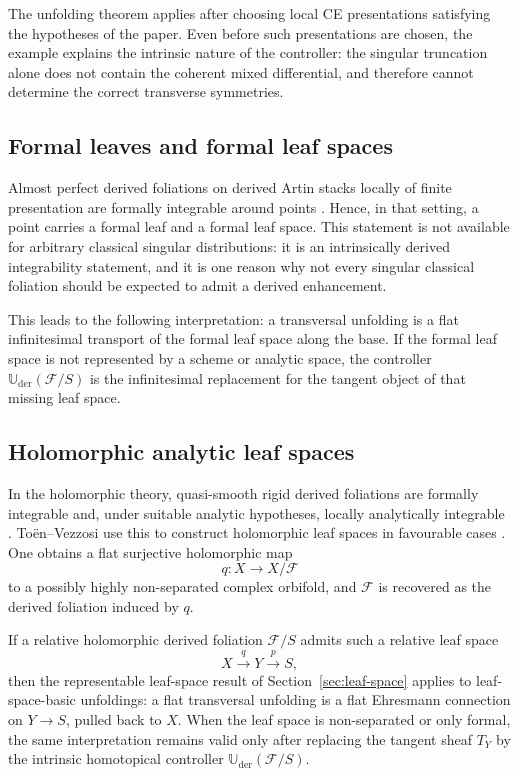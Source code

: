 \documentclass[11pt,reqno,a4paper,dvipsnames,x11names]{amsart}
\numberwithin{equation}{section}
\theoremstyle{plain}
\theoremstyle{definition}
\theoremstyle{remark}
\newcommand{\cF}{\mathcal F}
\newcommand{\Uder}{\mathbb U_{\mathrm{der}}}
\newcommand{\xto}[1]{\xrightarrow{#1}}
\newcommand{\from}{\colon}
\begin{document}
The unfolding theorem applies after choosing local CE presentations satisfying the hypotheses of the paper. Even before such presentations are chosen, the example explains the intrinsic nature of the controller: the singular truncation alone does not contain the coherent mixed differential, and therefore cannot determine the correct transverse symmetries.

\subsection{Formal leaves and formal leaf spaces}

Almost perfect derived foliations on derived Artin stacks locally of finite presentation are formally integrable around points \cite[Section~2.3]{TV}. Hence, in that setting, a point carries a formal leaf and a formal leaf space. This statement is not available for arbitrary classical singular distributions: it is an intrinsically derived integrability statement, and it is one reason why not every singular classical foliation should be expected to admit a derived enhancement.

This leads to the following interpretation: a transversal unfolding is a flat infinitesimal transport of the formal leaf space along the base. If the formal leaf space is not represented by a scheme or analytic space, the controller \(\Uder(\cF/S)\) is the infinitesimal replacement for the tangent object of that missing leaf space.

\subsection{Holomorphic analytic leaf spaces}

In the holomorphic theory, quasi-smooth rigid derived foliations are formally integrable and, under suitable analytic hypotheses, locally analytically integrable \cite[Chapters~5--6]{TV}. To\"en--Vezzosi use this to construct holomorphic leaf spaces in favourable cases \cite[Section~6.2]{TV}. One obtains a flat surjective holomorphic map
\[
 q\from X\longrightarrow X/\cF
\]
to a possibly highly non-separated complex orbifold, and \(\cF\) is recovered as the derived foliation induced by \(q\).

If a relative holomorphic derived foliation \(\cF/S\) admits such a relative leaf space
\[
 X\xto{q}Y\xto{p}S,
\]
then the representable leaf-space result of Section~\ref{sec:leaf-space} applies to leaf-space-basic unfoldings: a flat transversal unfolding is a flat Ehresmann connection on \(Y\to S\), pulled back to \(X\). When the leaf space is non-separated or only formal, the same interpretation remains valid only after replacing the tangent sheaf \(T_Y\) by the intrinsic homotopical controller \(\Uder(\cF/S)\).
\end{document}
